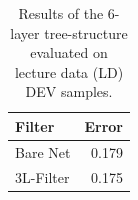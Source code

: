 \begin{table}[h!]
\caption{Results of the 6-layer tree-structure evaluated on lecture data (LD) DEV samples.}
\label{tab:resultsLD2l}
\centering
\begin{tabular}{| l | r |}
	\hline
	\textbf{Filter} & \textbf{Error}  \\
	\hline
	 Bare Net & 0.179 \\
	\hline
	3L-Filter & 0.175\\
	\hline
\end{tabular}
\end{table}





	